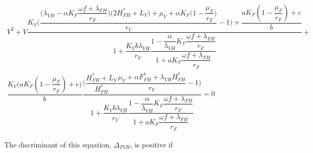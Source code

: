 \documentclass{article}
\newcommand{\lf}{\lambda_{FH}}
\newcommand{\lv}{\lambda_{VH}}
\newcommand{\FHterme}{\omega f + \lf}
\begin{document}
\newpage
\begin{landscape}



\begin{multline}
V^2 + V \dfrac{K_V \Big(
\dfrac{\big(\lv - \alpha K_F \dfrac{\FHterme}{r_F}\big)\big(2H^*_{FH} + L_V\big) + \mu_V + \alpha K_F \big(1-\dfrac{\mu_F}{r_F}\big)}{r_V} -1 \Big)
+ \dfrac{a K_F(1-\dfrac{\mu_F}{r_F}) + c}{b}
 }{1  +\dfrac{K_Vb\lv}{r_V}\dfrac{1- \dfrac{\alpha}{\lv} K_F \dfrac{\FHterme}{r_F}}{1 + a K_F\dfrac{\FHterme}{r_F}}}
  + \\
\dfrac{K_V\Big(a K_F(1-\dfrac{\mu_F}{r_F}) + c\Big)}{b} \dfrac{\Big(\dfrac{H^*_{FH} + L_V}{H^*_{FH}} \dfrac{\mu_V + \alpha F^*_{FH} + \lv H^*_{FH}}{r_V} - 1\Big)}{1  +\dfrac{K_Vb\lv}{r_V}\dfrac{1- \dfrac{\alpha}{\lv} K_F \dfrac{\FHterme}{r_F}}{1 + a K_F\dfrac{\FHterme}{r_F}}} = 0
\label{equilibreFVH:equationV}
\end{multline}


The discriminant of this equation, $\Delta_{FVH}$, is positive if


\end{landscape}
\end{document}
